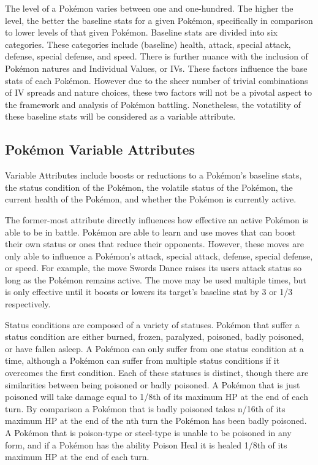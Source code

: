 \documentclass[12pt,twoside]{reedthesis}
\begin{document}
  The level of a Pokémon varies between one and one-hundred. The higher
  the level, the better the baseline stats for a given Pokémon,
  specifically in comparison to lower levels of that given Pokémon.
  Baseline stats are divided into six categories. These categories include
  (baseline) health, attack, special attack, defense, special defense, and
  speed. There is further nuance with the inclusion of Pokémon natures and
  Individual Values, or IVs. These factors influence the base stats of
  each Pokémon. However due to the sheer number of trivial combinations of
  IV spreads and nature choices, these two factors will not be a pivotal
  aspect to the framework and analysis of Pokémon battling. Nonetheless,
  the votatility of these baseline stats will be considered as a variable
  attribute.
  
  \subsection{Pokémon Variable
  Attributes}\label{pokemon-variable-attributes}
  
  Variable Attributes include boosts or reductions to a Pokémon's baseline
  stats, the status condition of the Pokémon, the volatile status of the
  Pokémon, the current health of the Pokémon, and whether the Pokémon is
  currently active.
  
  The former-most attribute directly influences how effective an active
  Pokémon is able to be in battle. Pokémon are able to learn and use moves
  that can boost their own status or ones that reduce their opponents.
  However, these moves are only able to influence a Pokémon's attack,
  special attack, defense, special defense, or speed. For example, the
  move Swords Dance raises its users attack status so long as the Pokémon
  remains active. The move may be used multiple times, but is only
  effective until it boosts or lowers its target's baseline stat by 3 or
  1/3 respectively.
  
  Status conditions are composed of a variety of statuses. Pokémon that
  suffer a status condition are either burned, frozen, paralyzed,
  poisoned, badly poisoned, or have fallen asleep. A Pokémon can only
  suffer from one status condition at a time, although a Pokémon can
  suffer from multiple status conditions if it overcomes the first
  condition. Each of these statuses is distinct, though there are
  similarities between being poisoned or badly poisoned. A Pokémon that is
  just poisoned will take damage equal to 1/8th of its maximum HP at the
  end of each turn. By comparison a Pokémon that is badly poisoned takes
  n/16th of its maximum HP at the end of the nth turn the Pokémon has been
  badly poisoned. A Pokémon that is poison-type or steel-type is unable to
  be poisoned in any form, and if a Pokémon has the ability Poison Heal it
  is healed 1/8th of its maximum HP at the end of each turn.
  
\end{document}
